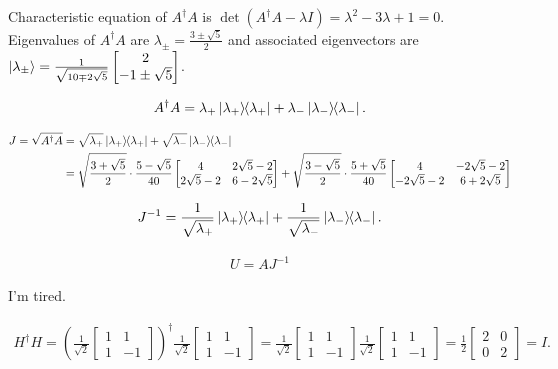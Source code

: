  Characteristic equation of $A^\dagger A$ is $\det(A^\dagger A - \lambda I) = \lambda^2 - 3 \lambda + 1 = 0$.
 Eigenvalues of $A^\dagger A$ are $\lambda_\pm = \frac{3 \pm \sqrt{5}}{2}$
 and associated eigenvectors are $\ket{\lambda_\pm} = \frac{1}{\sqrt{10 \mp 2 \sqrt{5}}} \begin{bmatrix}
 2 \\
 -1 \pm \sqrt{5}
 \end{bmatrix} $.

\begin{align*}
	A^\dagger A = \lambda_+ \ket{\lambda_+}\hspace{-1mm} \bra{\lambda_+} + \lambda_- \ket{\lambda_-}\hspace{-1mm} \bra{\lambda_-}.
\end{align*}

 \begin{align*}
 	J = \sqrt{A^\dagger A} &= \sqrt{\lambda_+} \ket{\lambda_+}\hspace{-1mm} \bra{\lambda_+} + \sqrt{\lambda_-} \ket{\lambda_-}\hspace{-1mm} \bra{\lambda_-}\\
 		&= \sqrt{\frac{3 + \sqrt{5}}{2}} \cdot \frac{5 - \sqrt{5}}{40} \begin{bmatrix}
 		4 & 2\sqrt{5} -2 \\
 		2 \sqrt{5} - 2 & 6 -2\sqrt{5}
 		\end{bmatrix}
 		+
 		\sqrt{\frac{3 - \sqrt{5}}{2}} \cdot \frac{5 + \sqrt{5}}{40} \begin{bmatrix}
 		4 & -2\sqrt{5} -2 \\
 		-2 \sqrt{5} - 2 & 6 +2\sqrt{5}
 		\end{bmatrix}
 \end{align*}


\begin{align*}
	J^{-1} = \frac{1}{ \sqrt{\lambda_+} } \ket{\lambda_+}\hspace{-1mm} \bra{\lambda_+} + \frac{1}{ \sqrt{\lambda_-} } \ket{\lambda_-}\hspace{-1mm} \bra{\lambda_-}.
\end{align*}


\begin{align*}
	U = AJ^{-1}
\end{align*}

I'm tired.





\begin{align*}
	H^\dagger H = \left(\frac{1}{\sqrt{2}} \begin{bmatrix}
	1 & 1 \\
	1 & -1
	\end{bmatrix}\right)^\dagger
	\frac{1}{\sqrt{2}} \begin{bmatrix}
	1 & 1 \\
	1 & -1
	\end{bmatrix}
	=
	\frac{1}{\sqrt{2}} \begin{bmatrix}
	1 & 1 \\
	1 & -1
	\end{bmatrix}
	\frac{1}{\sqrt{2}} \begin{bmatrix}
	1 & 1 \\
	1 & -1
	\end{bmatrix}
	=
	\frac{1}{2} \begin{bmatrix}
	2 & 0 \\
	0 & 2
	\end{bmatrix}
	=
	I.
\end{align*}





